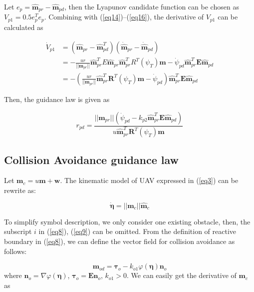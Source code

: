 \documentclass[a4paper, 10pt, conference]{ieeeconf}      %
\begin{document}
Let $e_{p}=\hat{\bm{m}}_{pr}-\hat{\bm{m}}_{pd}$, then the Lyapunov candidate function can be chosen as $V_{p1}=0.5e^T_{p}e_p$. Combining with (\ref{eq14})--(\ref{eq16}), the derivative of $V_{p1}$ can be calculated as

\begin{equation}\label{eq18}
	\begin{aligned}
		\dot{V}_{p1}&=(\hat{\bm{m}}_{pr}-\hat{\bm{m}}^T_{pd})(\dot{\hat{\bm{m}}}_{pr}-\dot{\hat{\bm{m}}}_{pd})\\
		&=-\frac{ur}{||\bm{m}_{pr}||}\hat{\bm{m}}^T_{pr}E\hat{\bm{m}}_{pr}\hat{\bm{m}}^T_{pr}R^T(\psi_T)\bm{m}-\dot{\psi}_{pd}\hat{\bm{m}}^T_{pr}\bm{E}\hat{\bm{m}}_{pd}\\
		&=-(\frac{ur}{||\bm{m}_{pr}||}\hat{\bm{m}}^T_{pr}\bm{R}^T(\psi_T)\bm{m}-\dot{\psi}_{pd})\hat{\bm{m}}^T_{pr}\bm{E}\hat{\bm{m}}_{pd}
	\end{aligned}
\end{equation}

Then, the guidance law is given as

\begin{equation}\label{eq19}
	r_{pd}=\frac{||\bm{m}_{pr}||(\dot{\psi}_{pd}-k_{p2}\hat{\bm{m}}^T_{pr}\bm{E}\hat{\bm{m}}_{pd})}{u\hat{\bm{m}}^T_{pr}\bm{R}^T(\psi_T)\bm{m}}
\end{equation}

\subsection{Collision Avoidance guidance law}

Let $\bm{m}_c=u\bm{m}+\bm{w}$. The kinematic model of UAV expressed in (\ref{eq3}) can be rewrite as:

\begin{equation}\label{eq20}
	\dot{\bm{\eta}}=||\bm{m}_{c}||\hat{\bm{m}}_{c}
\end{equation}

To simplify symbol description, we only consider one existing obstacle, then, the subscript $i$ in (\ref{eq8}), (\ref{eq9}) can be omitted. From the definition of reactive boundary in (\ref{eq8}), we can define the vector field for collision avoidance as follows:

\begin{equation}\label{eq21}
	\bm{m}_{od}=\bm{\tau}_{o}-k_{o1}\varphi(\bm{\eta}) \bm{n}_o
\end{equation}
where $\bm{n}_o=\nabla \varphi(\bm{\eta})$, $\bm{\tau}_o=\bm{E}\bm{n}_o$, $k_{o1}>0$. We can easily get the derivative of $\bm{m}_c$ as
\end{document}
